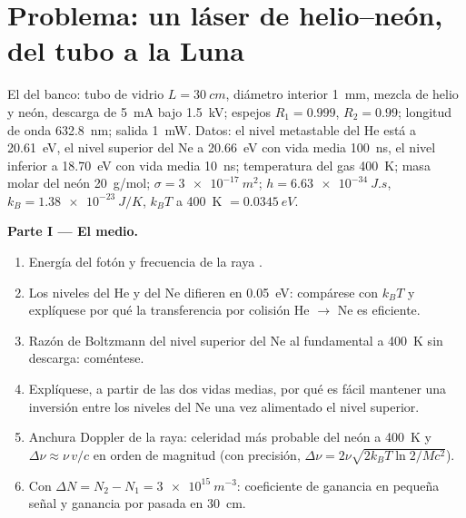 \section{Problema: un láser de helio--neón, del tubo a la Luna}

\begin{problem}\label{pb:b2:laser:1}
El  del banco: tubo de vidrio $L = \qty{30}{cm}$, diámetro interior
\qty{1}{mm}, mezcla de helio y neón, descarga de \qty{5}{mA} bajo
\qty{1.5}{kV}; espejos $R_1 = 0.999$, $R_2 = 0.99$; longitud de onda
\qty{632.8}{nm}; salida \qty{1}{mW}. Datos: el nivel metastable del He está
a \qty{20.61}{eV}, el nivel  superior del Ne a \qty{20.66}{eV} con
vida media \qty{100}{ns}, el nivel  inferior a \qty{18.70}{eV} con
vida media \qty{10}{ns}; temperatura del gas \qty{400}{K}; masa molar del neón
\qty{20}{g/mol};  $\sigma = \qty{3e-17}{m^2}$; $h =
\qty{6.63e-34}{J.s}$, $k_B = \qty{1.38e-23}{J/K}$, $k_BT$ a \qty{400}{K}
$= \qty{0.0345}{eV}$.

\textbf{Parte I --- El medio.}
\begin{enumerate}
  \item Energía del fotón y frecuencia de la raya .
  \item Los niveles del He y del Ne difieren en \qty{0.05}{eV}: compárese con
        $k_BT$ y explíquese por qué la transferencia por colisión He $\to$ Ne es
        eficiente.
  \item Razón de Boltzmann del nivel superior del Ne al fundamental a
        \qty{400}{K} sin descarga: coméntese.
  \item Explíquese, a partir de las dos vidas medias, por qué es fácil mantener una inversión
        entre los niveles del Ne una vez alimentado el nivel superior.
  \item Anchura Doppler de la raya: celeridad más probable del neón a
        \qty{400}{K} y $\Delta\nu \approx \nu\,v/c$ en orden de
        magnitud (con precisión, $\Delta\nu = 2\nu\sqrt{2k_BT\ln2/Mc^2}$).
  \item Con $\Delta N = N_2 - N_1 = \qty{3e15}{m^{-3}}$: coeficiente de ganancia
        en pequeña señal y ganancia por pasada en \qty{30}{cm}.
\end{enumerate}


\end{problem}
